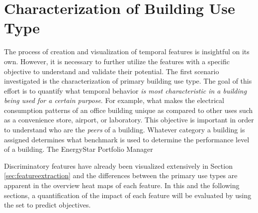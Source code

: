 \section{Characterization of Building Use Type}
\label{sec:results_usetype}

The process of creation and visualization of temporal features is insightful on its own. However, it is necessary to further utilize the features with a specific objective to understand and validate their potential. The first scenario investigated is the characterization of primary building use type. The goal of this effort is to quantify what temporal behavior \emph{is most characteristic in a building being used for a certain purpose}. For example, what makes the electrical consumption patterns of an office building unique as compared to other uses such as a convenience store, airport, or laboratory. This objective is important in order to understand who are the \emph{peers} of a building. Whatever category a building is assigned determines what benchmark is used to determine the performance level of a building. The EnergyStar Portfolio Manager 

Discriminatory features have already been visualized extensively in Section \ref{sec:featureextraction} and the differences between the primary use types are apparent in the overview heat maps of each feature. In this and the following sections, a quantification of the impact of each feature will be evaluated by using the set to predict objectives.